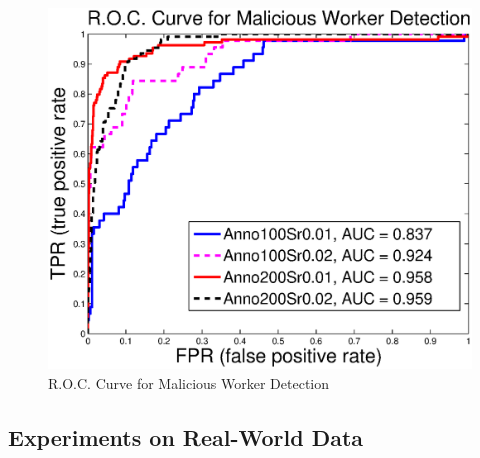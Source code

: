 \begin{figure}[h!]
  \begin{center}
    \includegraphics[scale= .50]{crowd-thurstonian/figure/roc.eps}
  \end{center}
  \caption{R.O.C. Curve for Malicious Worker Detection}\label{fig::roc}
\end{figure}

\subsection{Experiments on Real-World Data}

